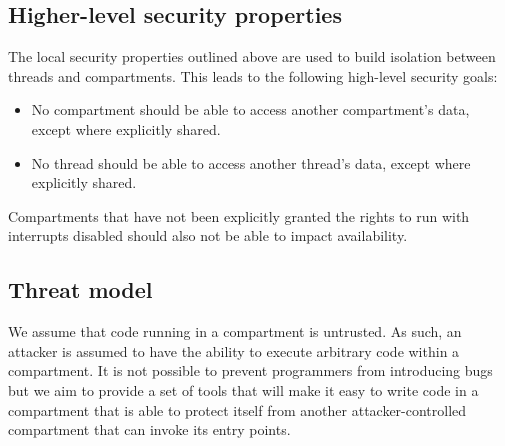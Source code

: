 \subsection{Higher-level security properties}

The local security properties outlined above are used to build isolation between threads and compartments.
This leads to the following high-level security goals:

\begin{itemize}
	\item No compartment should be able to access another compartment's data, except where explicitly shared.
	\item No thread should be able to access another thread's data, except where explicitly shared.
\end{itemize}

Compartments that have not been explicitly granted the rights to run with interrupts disabled should also not be able to impact availability.

\subsection{Threat model}

We assume that code running in a compartment is untrusted.
As such, an attacker is assumed to have the ability to execute arbitrary code within a compartment.
It is not possible to prevent programmers from introducing bugs but we aim to provide a set of tools that will make it easy to write code in a compartment that is able to protect itself from another attacker-controlled compartment that can invoke its entry points.

